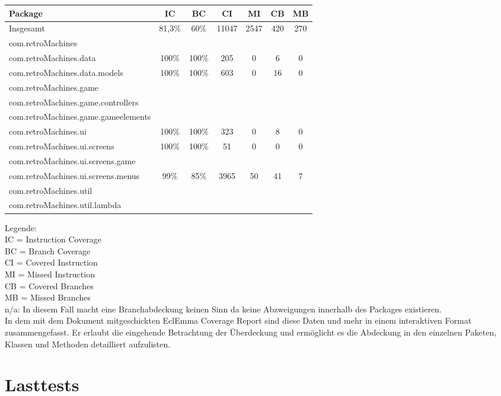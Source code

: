 \documentclass[parskip=full]{scrreprt}
\begin{document}
\begin{tabular} { | l | c | c | c | c | c | c | }
	\hline
	\textbf{Package} & \textbf{IC} & \textbf{BC} & \textbf{CI} & \textbf{MI} & \textbf{CB} & \textbf{MB} \\
	\hline
	Insgesamt & 81,3\% & 60\% & 11047 & 2547 & 420 & 270 \\
	\hline
	com.retroMachines \\
	\hline
	com.retroMachines.data & 100\% & 100\% & 205 & 0 & 6 & 0  \\
	\hline
	com.retroMachines.data.models & 100\% & 100\% & 603 & 0 & 16 & 0 \\
	\hline
	com.retroMachines.game \\
	\hline
	com.retroMachines.game.controllers \\
	\hline
	com.retroMachines.game.gameelements \\
	\hline
	com.retroMachines.ui & 100\% & 100\% & 323 & 0 & 8 & 0 \\
	\hline
	com.retroMachines.ui.screens & 100\% & 100\% & 51 & 0 & 0 & 0 \\
	\hline
	com.retroMachines.ui.screens.game \\
	\hline
	com.retroMachines.ui.screens.menus & 99\% & 85\% & 3965 & 50 & 41 & 7 \\
	\hline
	com.retroMachines.util \\
	\hline
	com.retroMachines.util.lambda \\
	\hline
\end{tabular}

Legende: \\
	IC = Instruction Coverage \\
	BC = Branch Coverage \\
	CI = Covered Instruction \\
	MI = Missed Instruction \\
	CB = Covered Branches \\
	MB = Missed Branches \\
	n/a: In diesem Fall macht eine Branchabdeckung keinen Sinn da keine Abzweigungen innerhalb des Packages existieren. \\

In dem mit dem Dokument mitgeschickten EclEmma Coverage Report sind diese Daten und mehr in einem interaktiven Format zusammengefasst. 
Er erlaubt die eingehende Betrachtung der Überdeckung und ermöglicht es die Abdeckung in den einzelnen Paketen, Klassen und Methoden detailliert aufzulisten.

\chapter{Lasttests}
\end{document}
